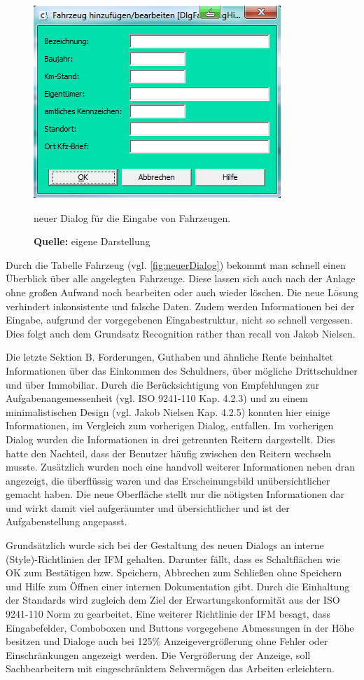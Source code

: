 \begin{figure}[H]
  \centering
  \includegraphics[scale=0.9]{img/FahrzeugAnlegenBearbeiten_Dialog.PNG}
  \caption{neuer Dialog für die Eingabe von Fahrzeugen.}
    \caption*{\textbf{Quelle:} eigene Darstellung}
  \label{fig:fahrzeugAnlegenBearbeitenDialog}
\end{figure}
Durch die Tabelle \glqq Fahrzeug\grqq{} (vgl. \ref{fig:neuerDialog}) bekommt man schnell einen Überblick über alle angelegten Fahrzeuge. Diese lassen sich auch nach der Anlage ohne großen Aufwand noch bearbeiten oder auch wieder löschen. Die neue Lösung verhindert inkonsistente und falsche Daten. Zudem werden Informationen bei der Eingabe, aufgrund der vorgegebenen Eingabestruktur, nicht so schnell vergessen. Dies folgt auch dem Grundsatz \glqq Recognition rather than recall\grqq{} von Jakob Nielsen.

Die letzte Sektion \glqq B. Forderungen, Guthaben und ähnliche Rente\grqq{} beinhaltet Informationen über das Einkommen des Schuldners, über mögliche Drittschuldner und über Immobiliar. Durch die Berücksichtigung von Empfehlungen zur Aufgabenangemessenheit (vgl. ISO 9241-110 Kap. 4.2.3) und zu einem minimalistischen Design (vgl. Jakob Nielsen Kap. 4.2.5) konnten hier einige Informationen, im Vergleich zum vorherigen Dialog, entfallen. Im vorherigen Dialog wurden die Informationen in drei getrennten Reitern dargestellt. Dies hatte den Nachteil, dass der Benutzer häufig zwischen den Reitern wechseln musste. Zusätzlich wurden noch eine handvoll weiterer Informationen neben dran angezeigt, die überflüssig waren und das Erscheinungsbild unübersichtlicher gemacht haben. Die neue Oberfläche stellt nur die nötigsten Informationen dar und wirkt damit viel aufgeräumter und übersichtlicher und ist der Aufgabenstellung angepasst.

Grundsätzlich wurde sich bei der Gestaltung des neuen Dialogs an interne (Style)-Richtlinien der IFM gehalten. Darunter fällt, dass es Schaltflächen wie \glqq OK\grqq{} zum Bestätigen bzw. Speichern, \glqq Abbrechen\grqq{} zum Schließen ohne Speichern und \glqq Hilfe\grqq{} zum Öffnen einer internen Dokumentation gibt. Durch die Einhaltung der Standards wird zugleich dem Ziel der Erwartungskonformität aus der ISO 9241-110 Norm  zu gearbeitet. Eine weiterer Richtlinie der IFM besagt, dass Eingabefelder, Comboboxen und Buttons vorgegebene Abmessungen in der Höhe besitzen und Dialoge auch bei 125\% Anzeigevergrößerung ohne Fehler oder Einschränkungen angezeigt werden. Die Vergrößerung der Anzeige, soll Sachbearbeitern mit eingeschränktem Sehvermögen das Arbeiten erleichtern.

